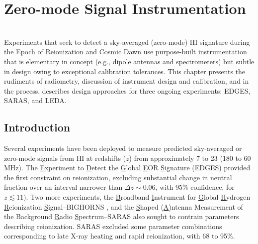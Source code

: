 
%
%

\chapter{Zero-mode Signal Instrumentation}

\begin{bf}
\author{  
L. J. Greenhill 
(Harvard-Smithsonian Center for Astrophysics) \\
R. Subrahmanyan 
(Raman Research Institute)   
}\\



\noindent
Experiments that seek to detect a sky-averaged (zero-mode) HI signature during the Epoch of Reionization and Cosmic Dawn use purpose-built instrumentation that is elementary in concept (e.g., dipole antennas and spectrometers) but subtle in design owing to exceptional calibration tolerances.  This chapter presents the rudiments of radiometry, discussion of instrument design and calibration, and in the process, describes design approaches for three ongoing experiments: EDGES, SARAS, and LEDA. \\

\end{bf}

\section{Introduction}

Several experiments have been deployed to measure predicted sky-averaged or zero-mode signals from HI at redshifts ($z$) from approximately 7 to 23 (180 to 60 MHz). The {\underline E}xperiment to
{\underline D}etect the {\underline G}lobal {\underline E}OR {\underline S}ignature (EDGES) \cite{bowman08,rogers12} provided the first constraint on reionization, excluding substantial change in neutral fraction over an interval narrower than $\Delta z\sim 0.06$, with 95\% confidence, for $z\lesssim11)$. Two more experiments, the {\underline B}roadband {\underline I}nstrument for {\underline G}lobal {\underline H}ydrogen {\underline R}eionization {\underline S}ignal--BIGHORNS \cite{sokolowski15}, and the {\underline S}haped (\underline A)ntenna Measurement of the Background {\underline Ra}dio {\underline S}pectrum--SARAS \cite{patra13, singh17, singh18} also sought to contrain parameters describing reionization.  SARAS excluded some parameter combinations corresponding to late X-ray heating and rapid reionization, with 68 to 95\%.  

